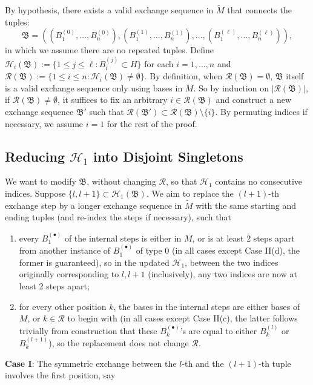 \documentclass{amsart}
\newcommand\Hcal{{\mathcal H}}
\newcommand\Rcal{{\mathcal R}}
\begin{document}
By hypothesis, there exists a valid exchange sequence in $\widetilde{M}$ that connects the tuples: $$\mathfrak{B}=((B_1^{(0)},\ldots,B_n^{(0)}), (B_1^{(1)},\ldots,B_n^{(1)}),\ldots,(B_1^{(\ell)},\ldots,B_n^{(\ell)})),$$
in which we assume there are no repeated tuples.
Define $\Hcal_i(\mathfrak{B}):=\{1\leq j\leq\ell: B_i^{(j)}\subset H\}$ for each $i=1,\ldots,n$ and $\Rcal(\mathfrak{B}):=\{1\leq i\leq n:\Hcal_i(\mathfrak{B})\neq\emptyset\}$. By definition, when $\Rcal(\mathfrak{B})=\emptyset$, $\mathfrak{B}$ itself is a valid exchange sequence only using bases in $M$. So by induction on $|\Rcal(\mathfrak{B})|$, if $\Rcal(\mathfrak{B})\neq\emptyset$, it suffices to fix an arbitrary $i\in\Rcal(\mathfrak{B})$ and construct a new exchange sequence $\mathfrak{B}'$ such that $\Rcal(\mathfrak{B}')\subset\Rcal(\mathfrak{B})\setminus\{i\}$. By permuting indices if necessary, we assume $i=1$ for the rest of the proof.

\subsection{Reducing $\Hcal_1$ into Disjoint Singletons}

We want to modify $\mathfrak{B}$, without changing $\Rcal$, so that $\Hcal_1$ contains no consecutive indices. Suppose $\{l,l+1\}\subset\Hcal_1(\mathfrak{B})$. We aim to replace the $(l+1)$-th exchange step by a longer exchange sequence in $\widetilde{M}$ with the same starting and ending tuples (and re-index the steps if necessary), such that
\begin{enumerate}
    \item every $B_1^{(\bullet)}$ of the internal steps is either in $M$, or is at least 2 steps apart from another instance of $B_1^{(\bullet)}$ of type 0 (in all cases except Case II(d), the former is guaranteed), so in the updated $\Hcal_1$, between the two indices originally corresponding to $l,l+1$ (inclusively), any two indices are now at least 2 steps apart;
    \item for every other position $k$, the bases in the internal steps are either bases of $M$, or $k\in\Rcal$ to begin with (in all cases except Case II(c), the latter follows trivially from construction that these $B_k^{(\bullet)}$'s are equal to either $B_k^{(l)}$ or $B_k^{(l+1)}$), so the replacement does not change $\Rcal$.
\end{enumerate}

{\bf Case I}: The symmetric exchange between the $l$-th and the $(l+1)$-th tuple involves the first position, say
\end{document}
